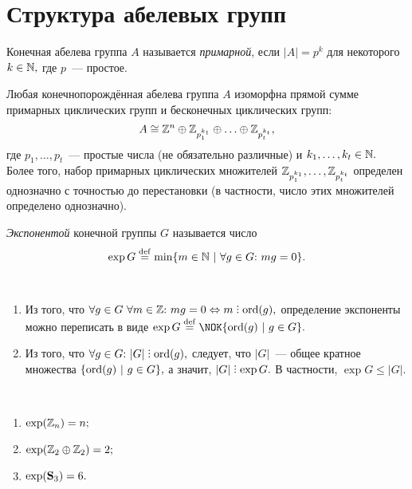 \newpage
        \section{Структура абелевых групп}
        \setcounter{definition}{0}
	\begin{definition}
		Конечная абелева группа $A$ называется \textit{примарной}, если ${|A| = p^k}$ для некоторого ${k \in \mathbb{N},}$ где $p$~--- простое.
	\end{definition}
	\begin{theorem}
        Любая конечнопорождённая абелева группа $A$
        изоморфна прямой сумме примарных циклических групп и бесконечных циклических групп: 
        \begin{equation*}
            A \cong \mathbb{Z}^n \oplus \mathbb{Z}_{p^{k_1}_1} \oplus \ldots \oplus \mathbb{Z}_{p^{k_t}_t},
        \end{equation*}
        где ${p_1, \ldots, p_t}$~--- простые числа (не обязательно различные) и ${k_1, \ldots, k_t \in \mathbb{N}.}$ Более того, набор примарных циклических множителей ${\mathbb{Z}_{p^{k_1}_1}, \ldots, \mathbb{Z}_{p^{k_t}_t}}$ определен однозначно с точностью до перестановки (в частности, число этих множителей определено однозначно).
	\end{theorem}
	\begin{definition}
		\textit{Экспонентой} конечной группы $G$ называется число
		\begin{equation*}
			\exp G \stackrel{\mathrm{def}}{=} \min \{m \in \mathbb{N} \ | \ \forall g \in G{:}{ } \  mg = 0\}.
		\end{equation*}
	\end{definition}
	\begin{remark}
		\
		\begin{enumerate}
			\setlength\itemsep{0.1em}
			\item Из того, что ${\forall g \in G \  \forall m \in \integers\suchthat mg = 0 \Leftrightarrow m \divby \ord(g),}$ определение экспоненты можно переписать в виде ${\exp G \deq \NOK \{\ord(g) \ | \ g \in G\}.}$
			\item Из того, что ${\forall g \in G\suchthat |G| \divby \ord(g),}$ следует, что $|G|$~--- общее кратное
			множества ${\{\mathrm{ord}(g) \ | \ g \in G\},}$ а значит, ${|G| \divby \exp G.}$ В частности,
			${\exp G \leqslant |G|.}$
		\end{enumerate}
	\end{remark}
        \begin{exmpls}
            \
            \begin{enumerate}
            \setlength\itemsep{0.1em}
                \item $\exp(\mathbb{Z}_n) = n;$
                \item $\exp(\mathbb{Z}_2 \oplus \mathbb{Z}_2) = 2;$
                \item $\exp(\mathbf{S}_3) = 6.$
            \end{enumerate}
        \end{exmpls}
